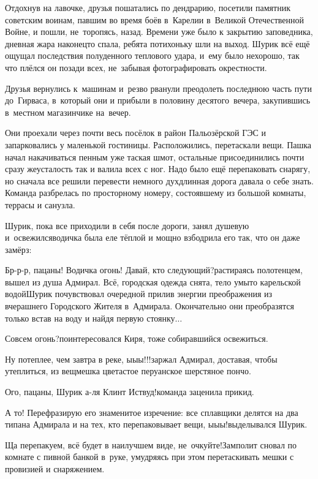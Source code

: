 Отдохнув на лавочке, друзья пошатались по дендрарию, посетили памятник советским воинам, павшим во время боёв в~Карелии в~Великой Отечественной Войне, и пошли, не~торопясь, назад. Времени уже было к закрытию заповедника, дневная жара наконец\sdash то спала, ребята потихоньку шли на выход. Шурик всё ещё ощущал последствия полуденного теплового удара, и~ему было нехорошо, так что плёлся он позади всех, не~забывая фотографировать окрестности. 

Друзья вернулись к~машинам и~резво рванули преодолеть последнюю часть пути до~Гирваса, в~который они и прибыли в половину десятого~вечера, закупившись в~местном магазинчике на~вечер.

Они проехали через почти весь посёлок в район Пальозёрской ГЭС и запарковались у маленькой гостиницы. Расположились, перетаскали вещи. Пашка начал накачиваться пенным уже таская шмот, остальные присоединились почти сразу же\mdash усталость так и валила всех с ног. Надо было ещё перепаковать снарягу, но сначала все решили перевести немного дух\mdash длинная дорога давала о себе знать. Команда разбрелась по просторному номеру, состоявшему из большой комнаты, террасы и санузла. 

Шурик, пока все приходили в себя после дороги, занял душевую и~освежился\mdash водичка была еле тёплой и мощно взбодрила его так, что он даже замёрз:

\diagdash Бр-р-р, пацаны! Водичка огонь! Давай, кто следующий?\mdash растираясь полотенцем, вышел из душа Адмирал. Всё, городская одежда снята, тело умыто карельской водой\mdash Шурик почувствовал очередной прилив энергии преображения из вчерашнего Городского Жителя в~Адмирала. Окончательно они преобразятся только встав на воду и найдя первую стоянку$\ldots$

\diagdash Совсем огонь?\mdash поинтересовался Киря, тоже собиравшийся освежиться.

\diagdash Ну потеплее, чем завтра в реке, ы\sdash ы\sdash ы!!!\mdash заржал Адмирал, доставая, чтобы утеплиться, из вещмешка цветастое перуанское шерстяное пончо.

\diagdash Ого, пацаны, Шурик а-ля Клинт Иствуд!\mdash команда заценила прикид.

\diagdash А то! Перефразирую его знаменитое изречение: все сплавщики делятся на два типа\mdash на Адмирала и на тех, кто перепаковывает вещи, ы\sdash ы\sdash ы!\mdash выделывался Шурик.

\diagdash Ща перепакуем, всё будет в наилучшем виде, не~очкуйте!\mdash Замполит сновал по комнате с пивной банкой в~руке, умудряясь при этом перетаскивать мешки с провизией и снаряжением.

